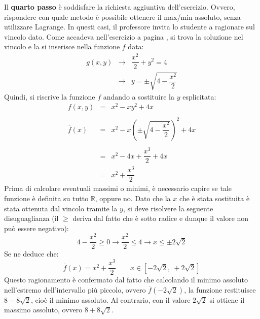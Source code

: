\documentclass[a4paper]{article}
\begin{document}
	\noindent
	Il \textbf{quarto passo} è soddisfare la richiesta aggiuntiva dell'esercizio. Ovvero, rispondere con quale metodo è possibile ottenere il max/min assoluto, senza utilizzare Lagrange. In questi casi, il professore invita lo studente a ragionare sul vincolo dato.
	Come accadeva nell'esercizio a pagina \pageref{par: trovare il massimo/minimo assoluto della funzione nel caso sia soggetta ad un vincolo}, si trova la soluzione nel vincolo e la si inserisce nella funzione $f$ data:
	\begin{equation*}
		\begin{array}{rcl}
			g\left(x,y\right) &\longrightarrow& \dfrac{x^{2}}{2} + y^{2} = 4 \\
			&\longrightarrow& y = \pm \sqrt{4 - \dfrac{x^{2}}{2}}
		\end{array}
	\end{equation*}
	Quindi, si riscrive la funzione $f$ andando a sostituire la $y$ esplicitata:
	\begin{equation*}
		\begin{array}{rcl}
			f\left(x,y\right) &=& x^{2}-xy^{2}+4x \\
			\\
			\overline{f}\left(x\right) &=& x^{2} - x\left(\pm \sqrt{4 - \dfrac{x^{2}}{2}}\right)^{2} + 4x \\
			\\
			&=& x^{2} - 4x + \dfrac{x^{3}}{2} + 4x \\
			&=& x^{2} + \dfrac{x^{3}}{2}
		\end{array}
	\end{equation*}
	Prima di calcolare eventuali massimi o minimi, è necessario capire se tale funzione è definita su tutto $\mathbb{R}$, oppure no. Dato che la $x$ che è stata sostituita è stata ottenuta dal vincolo tramite la $y$, si deve risolvere la seguente disuguaglianza (il $\ge$ deriva dal fatto che è sotto radice e dunque il valore non può essere negativo):
	\begin{equation*}
		4 - \dfrac{x^{2}}{2} \ge 0 \longrightarrow \dfrac{x^{2}}{2} \le 4 \longrightarrow x \le \pm 2\sqrt{2}
	\end{equation*}
	Se ne deduce che:
	\begin{equation*}
		\overline{f}\left(x\right) = x^{2} + \dfrac{x^{3}}{2} \hspace{2em} x \in \left[-2\sqrt{2},\: +2\sqrt{2}\right]
	\end{equation*}
	Questo ragionamento è confermato dal fatto che calcolando il minimo assoluto nell'estremo dell'intervallo più piccolo, ovvero $\overline{f}\left(-2\sqrt{2}\right)$, la funzione restituisce $8-8\sqrt{2}$, cioè il minimo assoluto. Al contrario, con il valore $2\sqrt{2}$ si ottiene il massimo assoluto, ovvero $8+8\sqrt{2}$.\newpage
\end{document}
